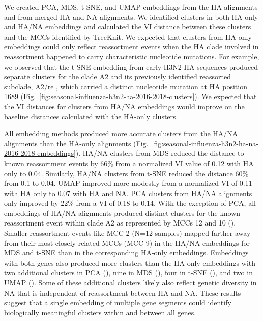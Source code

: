 \documentclass[10pt,letterpaper]{article}
\begin{document}
We created PCA, MDS, t-SNE, and UMAP embeddings from the HA alignments and from merged HA and NA alignments.
We identified clusters in both HA-only and HA/NA embeddings and calculated the VI distance between these clusters and the MCCs identified by TreeKnit.
We expected that clusters from HA-only embeddings could only reflect reassortment events when the HA clade involved in reassortment happened to carry characteristic nucleotide mutations.
For example, we observed that the t-SNE embedding from early H3N2 HA sequences produced separate clusters for the clade A2 and its previously identified reassorted subclade, A2/re \cite{Potter2019}, which carried a distinct nucleotide mutation at HA position 1689 (Fig.~\ref{fig:seasonal-influenza-h3n2-ha-2016-2018-clusters}).
We expected that the VI distances for clusters from HA/NA embeddings would improve on the baseline distances calculated with the HA-only clusters.

All embedding methods produced more accurate clusters from the HA/NA alignments than the HA-only alignments (Fig.~\ref{fig:seasonal-influenza-h3n2-ha-na-2016-2018-embeddings}).
HA/NA clusters from MDS reduced the distance to known reassortment events by 66\% from a normalized VI value of 0.12 with HA only to 0.04.
Similarly, HA/NA clusters from t-SNE reduced the distance 60\% from 0.1 to 0.04.
UMAP improved more modestly from a normalized VI of 0.11 with HA only to 0.07 with HA and NA.
PCA clusters from HA/NA alignments only improved by 22\% from a VI of 0.18 to 0.14.
With the exception of PCA, all embeddings of HA/NA alignments produced distinct clusters for the known reassortment event within clade A2 as represented by MCCs 12 and 10 ().
Smaller reassortment events like MCC 2 (N=12 samples) mapped farther away from their most closely related MCCs (MCC 9) in the HA/NA embeddings for MDS and t-SNE than in the corresponding HA-only embeddings.
Embeddings with both genes also produced more clusters than the HA-only embeddings with two additional clusters in PCA (), nine in MDS (), four in t-SNE (), and two in UMAP ().
Some of these additional clusters likely also reflect genetic diversity in NA that is independent of reassortment between HA and NA.
These results suggest that a single embedding of multiple gene segments could identify biologically meaningful clusters within and between all genes.
\end{document}
